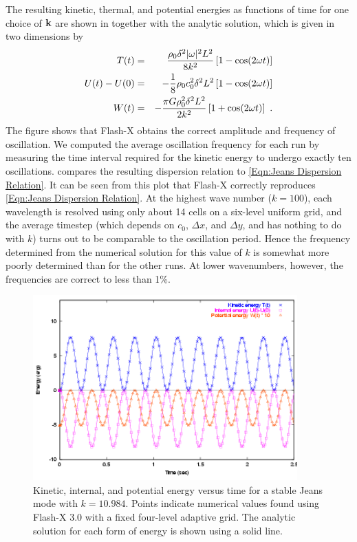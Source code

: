 The resulting kinetic, thermal, and potential energies as functions
of time for one choice of ${\bf k}$ are shown in  together with the analytic solution, which is given in two
dimensions by
\begin{eqnarray}
\nonumber
T(t) &=& {\rho_0\delta^2|\omega|^2L^2\over 8k^2}\left[1-{\rm cos}(2\omega t)
  \right] \\
\label{Eqn:Jeans Energies}
U(t)-U(0) &=& -{1\over 8}\rho_0c_0^2\delta^2L^2\left[1-{\rm cos}(2\omega t)
  \right] \\
\nonumber
W(t) &=& -{\pi G\rho_0^2\delta^2L^2\over 2k^2}\left[1+{\rm cos}(2\omega t)
  \right]\ .
\end{eqnarray}
The figure shows that Flash-X obtains the correct amplitude and
frequency of oscillation. We computed the average oscillation
frequency for each run by measuring the time interval required for
the kinetic energy to undergo exactly ten oscillations.
 compares the resulting dispersion
relation to \eqref{Eqn:Jeans Dispersion Relation}. It can be seen
from this plot that Flash-X correctly reproduces \eqref{Eqn:Jeans
Dispersion Relation}. At the highest wave number ($k = 100$), each
wavelength is resolved using only about 14 cells on a six-level
uniform grid, and the average timestep (which depends on $c_0$,
$\Delta x$, and $\Delta y$, and has nothing to do with $k$) turns
out to be comparable to the oscillation period. Hence the frequency
determined from the numerical solution for this value of $k$ is
somewhat more poorly determined than for the other runs. At lower
wavenumbers, however, the frequencies are correct to less than 1\%.

\begin{figure}[!ht]
\begin{center}
\includegraphics[width=4.0in]{Jeans_ener}
\caption{\label{Fig:Jeans energies} Kinetic, internal, and potential
energy versus time for a stable Jeans mode with $k=10.984$.
Points indicate numerical values found using Flash-X 3.0 with a fixed four-level
adaptive grid.
The analytic solution for each form of energy is shown using a solid line.}
\end{center}
\end{figure}

